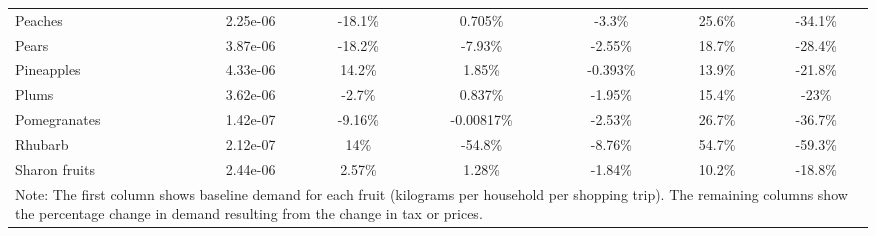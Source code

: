 \documentclass[11pt]{article}
\begin{document}
\begin{table}[h]
\begin{center}
{\begin{tabular}{lcccccc}
\hline
Peaches &2.25e-06 &-18.1\% &0.705\% &-3.3\% &25.6\% &-34.1\% \\
Pears &3.87e-06 &-18.2\% &-7.93\% &-2.55\% &18.7\% &-28.4\% \\
Pineapples &4.33e-06 &14.2\% &1.85\% &-0.393\% &13.9\% &-21.8\% \\
Plums &3.62e-06 &-2.7\% &0.837\% &-1.95\% &15.4\% &-23\% \\
Pomegranates &1.42e-07 &-9.16\% &-0.00817\% &-2.53\% &26.7\% &-36.7\% \\
\hline
Rhubarb &2.12e-07 &14\% &-54.8\% &-8.76\% &54.7\% &-59.3\% \\
Sharon fruits &2.44e-06 &2.57\% &1.28\% &-1.84\% &10.2\% &-18.8\% \\
 \hline \hline
\multicolumn{7}{p{1.0 \textwidth}}{Note: The first column shows baseline demand for each fruit (kilograms per household per shopping trip). The remaining columns show the percentage change in demand resulting from the change in tax or prices.}
\end{tabular}}
\end{center}
\end{table}
\end{document}
